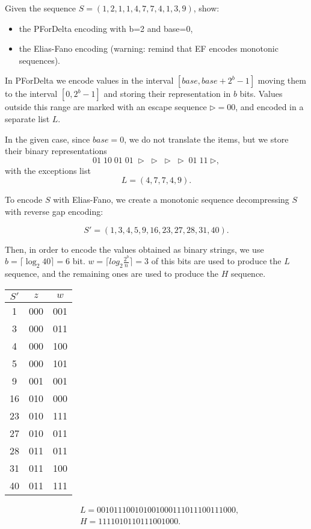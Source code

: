 \exercise

Given the sequence $S = (1, 2, 1, 1, 4, 7, 7, 4, 1, 3, 9)$, show:
%
\begin{itemize}
  \item the PForDelta encoding with b=2 and base=0,
  \item the Elias-Fano encoding (warning: remind that EF encodes monotonic
    sequences).
\end{itemize}

\solution

In PForDelta we encode values in the interval $[base,base+2^b-1]$ moving
them to the interval $[0, 2^b-1]$ and storing their representation in $b$ bits.
Values outside this range are marked with an escape sequence
$\triangleright=00$, and encoded in a separate list $L$.

In the given case, since $base=0$, we do not translate the items, but we store
their binary representations
%
$$01\;10\;01\;01\;\triangleright\;\triangleright\;\triangleright\;\triangleright\;01\;11\;\triangleright,$$
%
with the exceptions list
$$L=(4,7,7,4,9).$$

To encode $S$ with Elias-Fano, we create a monotonic sequence decompressing $S$
with reverse gap encoding:

$$S'=(1,3,4,5,9,16,23,27,28,31,40).$$

Then, in order to encode the values obtained as binary strings, we use $b = \lceil \log_2{40}\rceil = 6$ bit.
$w = \lceil log_2{\frac{2^b}{n}}\rceil = 3$ of this bits are used to produce the $L$ sequence, and the remaining ones
are used to produce the $H$ sequence.

\begin{center}
  \begin{tabular}{ c | c | c }
    $S'$ & $z$ & $w$ \\ \hline
     1 & 000 & 001 \\
     3 & 000 & 011 \\
     4 & 000 & 100 \\
     5 & 000 & 101 \\
     9 & 001 & 001 \\
     16 & 010 & 000 \\
     23 & 010 & 111 \\
     27 & 010 & 011 \\
     28 & 011 & 011 \\
     31 & 011 & 100 \\
     40 & 011 & 111
  \end{tabular}
\end{center}

\begin{align*}
    &L = 001011100101001000111011100111000, \\
    &H = 1111010110111001000.
\end{align*}

